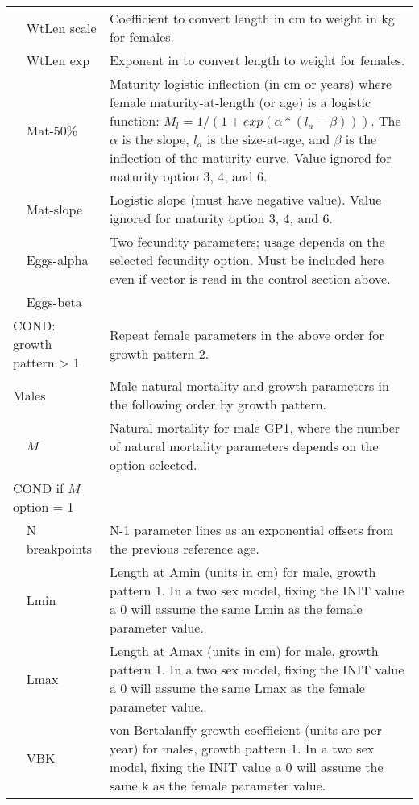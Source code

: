 \begin{longtable}{p{1cm} p{2.25cm} p{10cm}}
	\Tstrut & WtLen scale & Coefficient to convert length in cm to weight in kg for females. \\
	& WtLen exp & Exponent in to convert length to weight for females. \\
	& Mat-50\% & Maturity logistic inflection (in cm or years) where female maturity-at-length (or age) is a logistic function: $M_{l} = 1/(1+exp(\alpha*(l_{a} - \beta)))$. The $\alpha$ is the slope, $l_{a}$ is the size-at-age, and $\beta$ is the inflection of the maturity curve. Value ignored for maturity option 3, 4, and 6. \\ 
	& Mat-slope & Logistic slope (must have negative value). Value ignored for maturity option 3, 4, and 6. \\
	& Eggs-alpha & Two fecundity parameters; usage depends on the selected fecundity option. Must be included here even if vector is read in the control section above. \\
	& Eggs-beta & \Bstrut\\
	\hline

	\multicolumn{2}{l}{COND: growth pattern > 1} \Tstrut & Repeat female parameters in the above order for growth pattern 2. \Bstrut\\
	\hline

	\multicolumn{2}{l}{Males} \Tstrut & Male natural mortality and growth parameters in the following order by growth pattern. \Bstrut\\
	& $M$ & Natural mortality for male GP1, where the number of natural mortality parameters depends on the option selected. \Bstrut\\
	\hline
	\multicolumn{2}{l}{COND if $M$ option = 1} & \Tstrut\\
	& N breakpoints & N-1 parameter lines as an exponential offsets from the previous reference age. \Bstrut\\
	\hline
		
	& Lmin & Length at Amin (units in cm) for male, growth pattern 1. In a two sex model, fixing the INIT value a 0 will assume the same Lmin as the female parameter value. \\
	& Lmax & Length at Amax (units in cm) for male, growth pattern 1. In a two sex model, fixing the INIT value a 0 will assume the same Lmax as the female parameter value. \\
	& VBK & von Bertalanffy growth coefficient (units are per year) for males, growth pattern 1. In a two sex model, fixing the INIT value a 0 will assume the same k as the female parameter value. \Bstrut\\
	\hline


\end{longtable}
